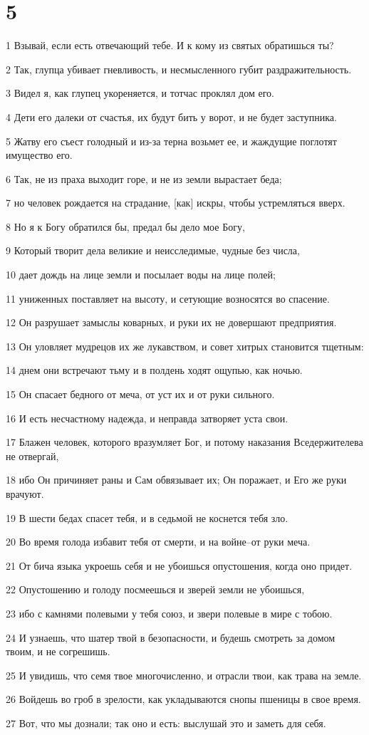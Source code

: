 \chapter{5}

\par 1 Взывай, если есть отвечающий тебе. И к кому из святых обратишься ты?
\par 2 Так, глупца убивает гневливость, и несмысленного губит раздражительность.
\par 3 Видел я, как глупец укореняется, и тотчас проклял дом его.
\par 4 Дети его далеки от счастья, их будут бить у ворот, и не будет заступника.
\par 5 Жатву его съест голодный и из-за терна возьмет ее, и жаждущие поглотят имущество его.
\par 6 Так, не из праха выходит горе, и не из земли вырастает беда;
\par 7 но человек рождается на страдание, [как] искры, чтобы устремляться вверх.
\par 8 Но я к Богу обратился бы, предал бы дело мое Богу,
\par 9 Который творит дела великие и неисследимые, чудные без числа,
\par 10 дает дождь на лице земли и посылает воды на лице полей;
\par 11 униженных поставляет на высоту, и сетующие возносятся во спасение.
\par 12 Он разрушает замыслы коварных, и руки их не довершают предприятия.
\par 13 Он уловляет мудрецов их же лукавством, и совет хитрых становится тщетным:
\par 14 днем они встречают тьму и в полдень ходят ощупью, как ночью.
\par 15 Он спасает бедного от меча, от уст их и от руки сильного.
\par 16 И есть несчастному надежда, и неправда затворяет уста свои.
\par 17 Блажен человек, которого вразумляет Бог, и потому наказания Вседержителева не отвергай,
\par 18 ибо Он причиняет раны и Сам обвязывает их; Он поражает, и Его же руки врачуют.
\par 19 В шести бедах спасет тебя, и в седьмой не коснется тебя зло.
\par 20 Во время голода избавит тебя от смерти, и на войне--от руки меча.
\par 21 От бича языка укроешь себя и не убоишься опустошения, когда оно придет.
\par 22 Опустошению и голоду посмеешься и зверей земли не убоишься,
\par 23 ибо с камнями полевыми у тебя союз, и звери полевые в мире с тобою.
\par 24 И узнаешь, что шатер твой в безопасности, и будешь смотреть за домом твоим, и не согрешишь.
\par 25 И увидишь, что семя твое многочисленно, и отрасли твои, как трава на земле.
\par 26 Войдешь во гроб в зрелости, как укладываются снопы пшеницы в свое время.
\par 27 Вот, что мы дознали; так оно и есть: выслушай это и заметь для себя.

